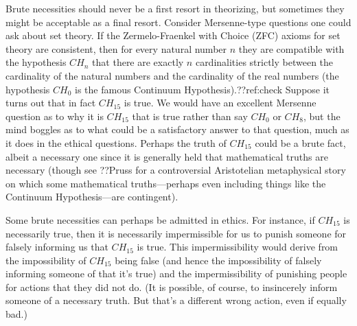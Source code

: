 Brute necessities should never be a first resort in theorizing, but sometimes they might be acceptable as a final resort. Consider
Mersenne-type questions one could ask about set theory. If the Zermelo-Fraenkel with Choice (ZFC) axioms for set theory are consistent, then for every natural number
$n$ they are compatible with the hypothesis $CH_n$ that there are exactly $n$ cardinalities strictly between the cardinality of the natural numbers and
the cardinality of the real numbers (the hypothesis $CH_0$ is the famous Continuum Hypothesis).??ref:check Suppose it turns out that in fact $CH_{15}$ is true.
We would have an excellent Mersenne question as to why it is $CH_{15}$ that is true rather than say $CH_0$ or $CH_8$, but the mind boggles as to what could be a satisfactory answer to that
question, much as it does in the ethical questions. Perhaps the truth of $CH_{15}$ could be a brute fact, albeit a necessary one since it is generally held that mathematical truths are necessary (though see ??Pruss for a
controversial Aristotelian metaphysical story on which some mathematical truths---perhaps even including things like the Continuum Hypothesis---are contingent). 

Some brute necessities can perhaps be admitted in ethics. For instance, if $CH_{15}$ is necessarily true, then it is necessarily impermissible 
for us to punish someone for falsely informing us that $CH_{15}$ is true. This impermissibility would derive from the impossibility of $CH_{15}$ being
false (and hence the impossibility of falsely informing someone of that it's true) and the impermissibility of punishing people for actions that they did not 
do. (It is possible, of course, to insincerely inform someone of a necessary truth. But that's a different wrong action, even if equally bad.) 


